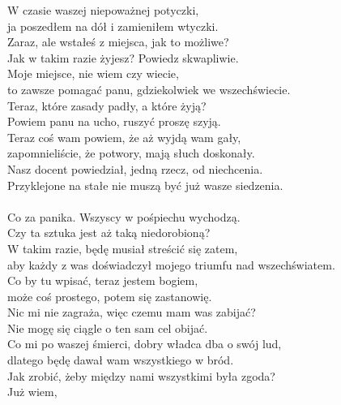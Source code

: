 \chardoc{}
W czasie waszej niepoważnej potyczki,\\
ja poszedłem na dół i zamieniłem wtyczki.\\

\charszam{}
Zaraz, ale wstałeś z miejsca, jak to możliwe?\\
Jak w takim razie żyjesz? Powiedz skwapliwie.\\

\chardoc{}
Moje miejsce, nie wiem czy wiecie,\\
to zawsze pomagać panu, gdziekolwiek we wszechświecie.\\
Teraz, które zasady padły, a które żyją?\\
Powiem panu na ucho, ruszyć proszę szyją.\\

\charfer{}
Teraz coś wam powiem, że aż wyjdą wam gały,\\
zapomnieliście, że potwory, mają słuch doskonały.\\
Nasz docent powiedział, jedną rzecz, od niechcenia.\\
Przyklejone na stałe nie muszą być już wasze siedzenia.\\

\\

\charszam{}
Co za panika. Wszyscy w pośpiechu wychodzą.\\
Czy ta sztuka jest aż taką niedorobioną?\\
W takim razie, będę musiał streścić się zatem,\\
aby każdy z was doświadczył mojego triumfu nad wszechświatem.\\
Co by tu wpisać, teraz jestem bogiem,\\
może coś prostego, potem się zastanowię.\\
Nic mi nie zagraża, więc czemu mam was zabijać?\\
Nie mogę się ciągle o ten sam cel obijać.\\
Co mi po waszej śmierci, dobry władca dba o swój lud,\\
dlatego będę dawał wam wszystkiego w bród.\\
Jak zrobić, żeby między nami wszystkimi była zgoda?\\
Już wiem, \\











